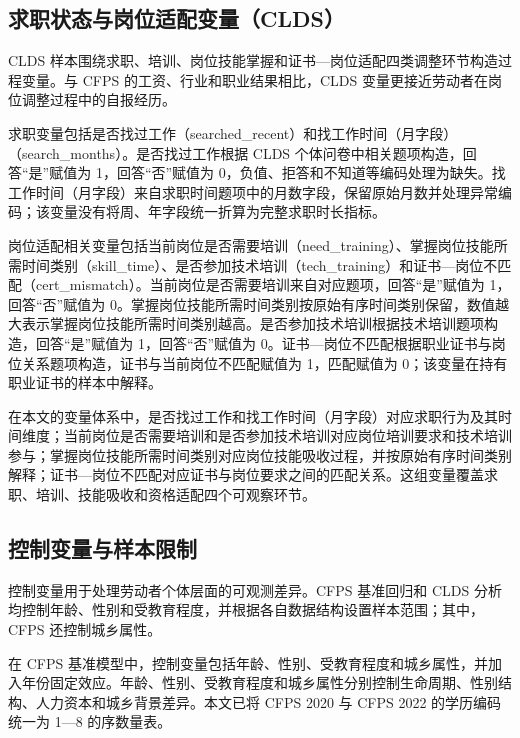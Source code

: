 \documentclass[UTF8, zihao=-4, a4paper, openany, fontset=none]{ctexrep}
\numberwithin{equation}{chapter}
\begin{document}
\subsection{求职状态与岗位适配变量（CLDS）}\label{ux6c42ux804cux72b6ux6001ux4e0eux5c97ux4f4dux9002ux914dux53d8ux91cfclds}

CLDS 样本围绕求职、培训、岗位技能掌握和证书---岗位适配四类调整环节构造过程变量。与 CFPS 的工资、行业和职业结果相比，CLDS 变量更接近劳动者在岗位调整过程中的自报经历。

求职变量包括是否找过工作（searched\_recent）和找工作时间（月字段）（search\_months）。是否找过工作根据 CLDS 个体问卷中相关题项构造，回答``是''赋值为 1，回答``否''赋值为 0，负值、拒答和不知道等编码处理为缺失。找工作时间（月字段）来自求职时间题项中的月数字段，保留原始月数并处理异常编码；该变量没有将周、年字段统一折算为完整求职时长指标。

岗位适配相关变量包括当前岗位是否需要培训（need\_training）、掌握岗位技能所需时间类别（skill\_time）、是否参加技术培训（tech\_training）和证书---岗位不匹配（cert\_mismatch）。当前岗位是否需要培训来自对应题项，回答``是''赋值为 1，回答``否''赋值为 0。掌握岗位技能所需时间类别按原始有序时间类别保留，数值越大表示掌握岗位技能所需时间类别越高。是否参加技术培训根据技术培训题项构造，回答``是''赋值为 1，回答``否''赋值为 0。证书---岗位不匹配根据职业证书与岗位关系题项构造，证书与当前岗位不匹配赋值为 1，匹配赋值为 0；该变量在持有职业证书的样本中解释。

在本文的变量体系中，是否找过工作和找工作时间（月字段）对应求职行为及其时间维度；当前岗位是否需要培训和是否参加技术培训对应岗位培训要求和技术培训参与；掌握岗位技能所需时间类别对应岗位技能吸收过程，并按原始有序时间类别解释；证书---岗位不匹配对应证书与岗位要求之间的匹配关系。这组变量覆盖求职、培训、技能吸收和资格适配四个可观察环节。

\subsection{控制变量与样本限制}\label{ux63a7ux5236ux53d8ux91cfux4e0eux6837ux672cux9650ux5236}

控制变量用于处理劳动者个体层面的可观测差异。CFPS 基准回归和 CLDS 分析均控制年龄、性别和受教育程度，并根据各自数据结构设置样本范围；其中，CFPS 还控制城乡属性。

在 CFPS 基准模型中，控制变量包括年龄、性别、受教育程度和城乡属性，并加入年份固定效应。年龄、性别、受教育程度和城乡属性分别控制生命周期、性别结构、人力资本和城乡背景差异。本文已将 CFPS 2020 与 CFPS 2022 的学历编码统一为 1---8 的序数量表。
\end{document}
